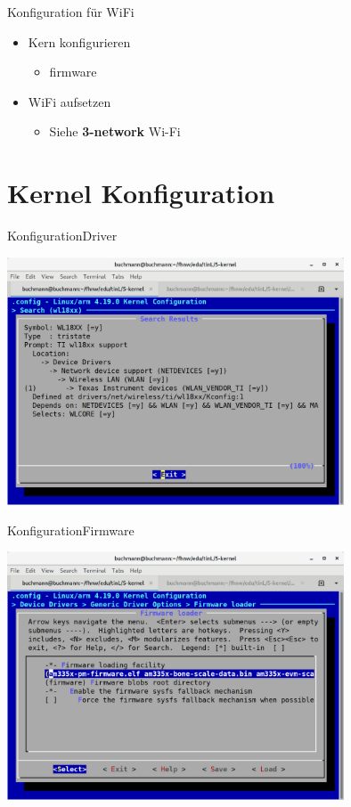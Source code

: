 \begin{frame}{Konfiguration für WiFi}
\begin{itemize}
 \item Kern konfigurieren
 \begin{itemize}
  \item firmware
 \end{itemize}
 \item WiFi aufsetzen
 \begin{itemize}
  \item Siehe {\bf 3-network} Wi-Fi 
 \end{itemize}
\end{itemize}
\end{frame}

\section{Kernel Konfiguration}

\begin{frame}{Konfiguration}{Driver}
\begin{center}
\includegraphics[width=0.75\textwidth]{wl18xx.png}
\end{center}
\end{frame}

\begin{frame}{Konfiguration}{Firmware}
\begin{center}
\includegraphics[width=0.75\textwidth]{firmware.png}
\end{center}
\end{frame}

